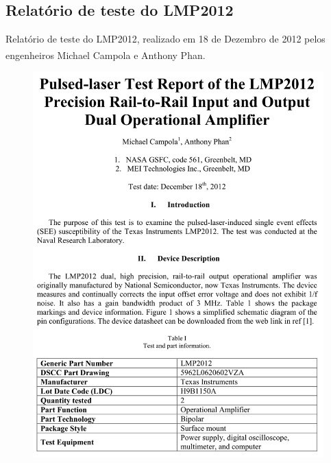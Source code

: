 \documentclass[
	12pt,				%
	openright,			%
	oneside,			%
	a4paper,			%
	english,			%
	french,				%
	spanish,			%
	brazil,				%
	oldfontcommands
	]{abntex2}
\begin{document}
\begin{anexosenv}
\chapter[Relatório de teste do LMP2012]{Relatório de teste do LMP2012} \label{LMP2012}	
	
	Relatório de teste do LMP2012, realizado em 18 de Dezembro de 2012 pelos engenheiros Michael Campola e Anthony Phan.\textsuperscript{\cite{LMP2012}}
	
		\begin{figure}[th]
		\centering
		\includegraphics[width=0.85\linewidth]{./anexos/lmp2012_1}	
	\end{figure}	
	

\end{anexosenv}
\end{document}
